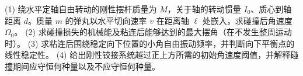 (1) 绕水平定轴自由转动的刚性摆杆质量为 \(M\)，关于轴的转动惯量 \(I_0\)、质心到轴距离 \(d\)。质量 \(m\) 的弹丸以水平切向速率 \(v\) 在距离轴 \(\ell\) 处嵌入，求碰撞后角速度 \(\Omega_0\)。
(2) 求碰撞损失的机械能及粘连后能够达到的最大摆角（在不发生整周运动时）。
(3) 求粘连后围绕稳定向下位置的小角自由振动频率，并判断向下平衡点的线性稳定性。
(4) 给出刚性铰接系统越过正上方所需的初始角速度阈值，并解释碰撞期间应守恒何种量以及不应守恒何种量。
